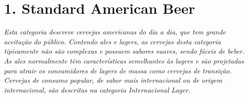 \section*{1. Standard American Beer}
\textit{Esta categoria descreve cervejas americanas do dia a dia, que tem grande aceitação do público. Contendo ales e lagers, as cervejas desta categoria tipicamente não são complexas e possuem sabores suaves, sendo fáceis de beber. As ales normalmente têm características semelhantes às lagers e são projetadas para atrair os consumidores de lagers de massa como cervejas de transição. Cervejas de consumo popular, de sabor mais internacional ou de origem internacional, são descritas na categoria Internacional Lager.}
